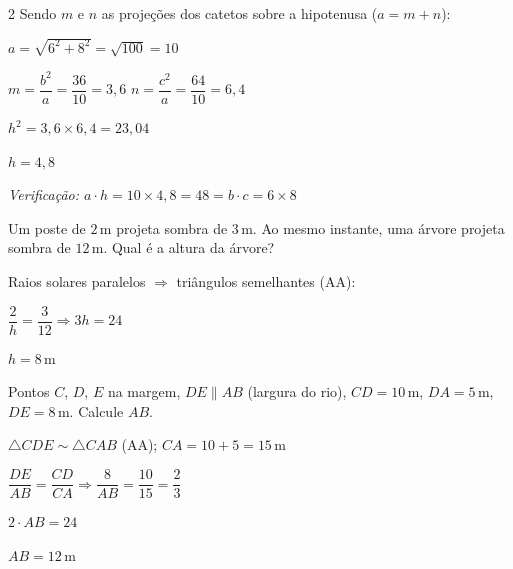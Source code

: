\documentclass[12pt]{article}
\begin{document}
\begin{multicols}{2}
Sendo $m$ e $n$ as projeções dos catetos sobre a hipotenusa ($a = m + n$):



$a = \sqrt{6^2 + 8^2} = \sqrt{100} = 10$\vspace{6pt}

$m = \dfrac{b^2}{a} = \dfrac{36}{10} = 3{,}6$ \quad $n = \dfrac{c^2}{a} = \dfrac{64}{10} = 6{,}4$\vspace{6pt}

$h^2 = 3{,}6 \times 6{,}4 = 23{,}04$\vspace{6pt}

$\boxed{h = 4{,}8}$

\vspace{0.1cm}
{\small\textit{Verificação: $a \cdot h = 10 \times 4{,}8 = 48 = b \cdot c = 6 \times 8$ \checkmark}}



Um poste de $2\,\text{m}$ projeta sombra de $3\,\text{m}$. Ao mesmo instante, uma árvore projeta sombra de $12\,\text{m}$. Qual é a altura da árvore?

\vspace{4pt}
Raios solares paralelos $\Rightarrow$ triângulos semelhantes (AA):\vspace{4pt}

$\dfrac{2}{h} = \dfrac{3}{12} \Rightarrow 3h = 24$\vspace{6pt}

$\boxed{h = 8\,\text{m}}$

\vspace{0.3cm}

Pontos $C$, $D$, $E$ na margem, $DE \parallel AB$ (largura do rio), $CD = 10\,\text{m}$, $DA = 5\,\text{m}$, $DE = 8\,\text{m}$. Calcule $AB$.

\vspace{4pt}
$\triangle CDE \sim \triangle CAB$ (AA); $CA = 10 + 5 = 15\,\text{m}$\vspace{6pt}

$\dfrac{DE}{AB} = \dfrac{CD}{CA} \Rightarrow \dfrac{8}{AB} = \dfrac{10}{15} = \dfrac{2}{3}$\vspace{6pt}

$2 \cdot AB = 24$\vspace{6pt}

$\boxed{AB = 12\,\text{m}}$

\end{multicols}


\end{document}
